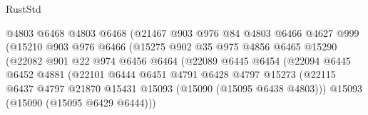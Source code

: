 \begin{lexlean}{RustStd}
\begin{coremodule}
                                    @4803
                                    @6468
                                    @4803
                                    @6468
                                    (@21467
                                      @903
                                      @976
                                      @84
                                      @4803
                                      @6466
                                      @4627
                                      @999
                                      (@15210
                                        @903
                                        @976
                                        @6466
                                        (@15275
                                          @902
                                          @35
                                          @975
                                          @4856
                                          @6465
                                          @15290
                                          (@22082
                                            @901
                                            @22
                                            @974
                                            @6456
                                            @6464
                                            (@22089
                                              @6445
                                              @6454
                                              (@22094
                                                @6445
                                                @6452
                                                @4881
                                                (@22101
                                                  @6444
                                                  @6451
                                                  @4791
                                                  @6428
                                                  @4797
                                                  @15273
                                                  (@22115
                                                    @6437
                                                    @4797
                                                    @21870
                                                    @15431
                                                    @15093
                                                    (@15090 (@15095 @6438 @4803)))
                                                  @15093
                                                  (@15090 (@15095 @6429 @6444)))

\end{coremodule}
\end{lexlean}
